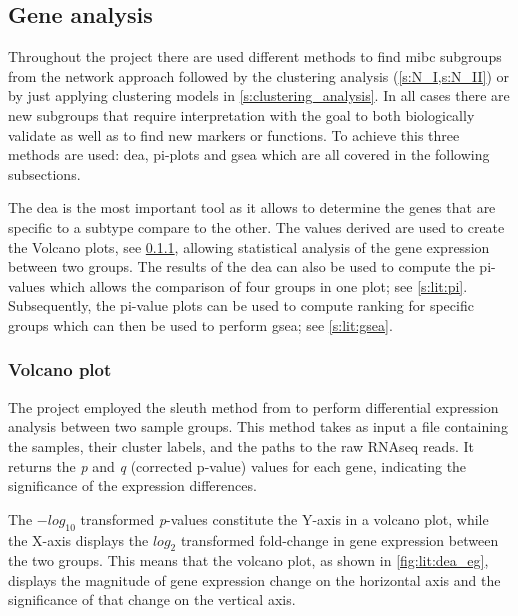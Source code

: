 \subsection{Gene analysis} \label{s:lit:gene_analysis}


Throughout the project there are used different methods to find \acrfull{mibc} subgroups from the network approach followed by the clustering analysis (\cref{s:N_I,s:N_II}) or by just applying clustering models in \cref{s:clustering_analysis}. In all cases there are new subgroups that require interpretation with the goal to both biologically validate as well as to find new markers or functions. To achieve this three methods are used: \acrfull{dea}, pi-plots and \acrfull{gsea} which are all covered in the following subsections. 

The \acrshort{dea} is the most important tool as it allows to determine the genes that are specific to a subtype compare to the other. The values derived are used to create the Volcano plots, see \cref{s:lit:dea}, allowing statistical analysis of the gene expression between two groups. The results of the \acrshort{dea} can also be used to compute the pi-values \citep{Xiao2014-zn} which allows the comparison of four groups in one plot; see \cref{s:lit:pi}. Subsequently, the pi-value plots can be used to compute ranking for specific groups which can then be used to perform \acrlong{gsea}; see \cref{s:lit:gsea}.


\subsubsection{Volcano plot} \label{s:lit:dea}


The project employed the sleuth method from \citeauthor{Pimentel2017-xp} to perform differential expression analysis between two sample groups. This method takes as input a file containing the samples, their cluster labels, and the paths to the raw RNAseq reads. It returns the \textit{p} and \textit{q} (corrected p-value) values for each gene, indicating the significance of the expression differences.

The $-log_{10}$ transformed \textit{p}-values constitute the Y-axis in a volcano plot, while the X-axis displays the $log_{2}$ transformed fold-change in gene expression between the two groups. This means that the volcano plot, as shown in \cref{fig:lit:dea_eg}, displays the magnitude of gene expression change on the horizontal axis and the significance of that change on the vertical axis.

